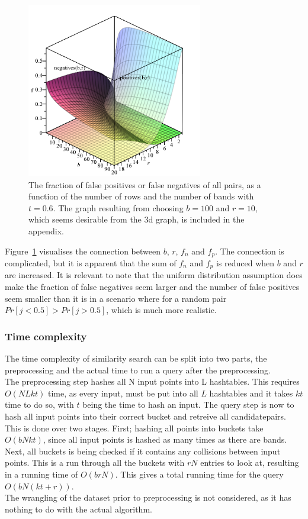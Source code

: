 \begin{figure}[H]
	\centering
	\includegraphics[width=290px]{img/falseGraph.png}
	\caption{The fraction of false positives or false negatives of all pairs, as a function of the number of rows and the number of bands with \(t=0.6\). The graph resulting from choosing \(b = 100\) and \(r = 10\), which seems desirable from the 3d graph, is included in the appendix.}
	\label{fig:false_graph}
\end{figure}

Figure~\ref{fig:false_graph} visualises the connection between \(b\), \(r\), \(f_n\) and \(f_p\). The connection is complicated, but it is apparent that the sum of \(f_n\) and \(f_p\) is reduced when \(b\) and \(r\) are increased. It is relevant to note that the uniform distribution assumption does make the fraction of false negatives seem larger and the number of false positives seem smaller than it is in a scenario where for a random pair \(Pr[j<0.5] > Pr[j>0.5]\), which is much more realistic.

\subsubsection{Time complexity}
The time complexity of similarity search can be split into two parts, the preprocessing and the actual time to run a query after the preprocessing.\\
The preprocessing step hashes all N input points into L hashtables. This requires \(O(NLkt)\) time, as every input, must be put into all \(L\) hashtables and it takes \(kt\) time to do so, with \(t\) being the time to hash an input. The query step is 
now to hash all input points into their correct bucket and retreive all candidatepairs. \\
This is done over two stages. First; hashing all points into buckets take \(O(bNkt)\), since all input points is hashed as many times as there are bands. Next, all buckets is being checked if it contains any collisions between input points. This is a run through all the buckets with \(rN\) entries to look at, resulting in a running time of \(O(brN)\). This gives a total running time for the query \(O(bN(kt+r))\). \\
The wrangling of the dataset prior to preprocessing is not considered, as it has nothing to do with the actual algorithm.

